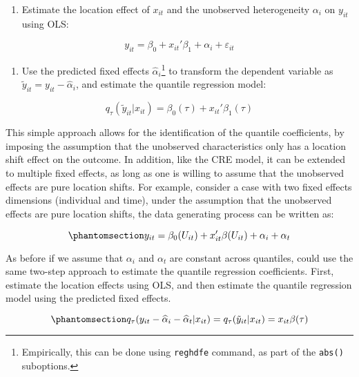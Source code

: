 \documentclass[bib]{statapress}
\providecommand{\tightlist}{%
  \setlength{\itemsep}{0pt}\setlength{\parskip}{0pt}}\usepackage{longtable,booktabs,array}
\begin{document}
\begin{enumerate}
\def\labelenumi{\arabic{enumi}.}
\tightlist
\item
  Estimate the location effect of \(x_{it}\) and the unobserved
  heterogeneity \(\alpha_i\) on \(y_{it}\) using OLS:
\end{enumerate}

\[y_{it}=\beta_0 +  x_{it}' \beta_1   +\alpha_i + \varepsilon_{it}
\]

\begin{enumerate}
\def\labelenumi{\arabic{enumi}.}
\setcounter{enumi}{1}
\tightlist
\item
  Use the predicted fixed effects \(\hat\alpha_i\)\footnote{Empirically,
    this can be done using \texttt{reghdfe} command, as part of the
    \texttt{abs()} suboptions.} to transform the dependent variable as
  \(\tilde y_{it}=y_{it}-\hat\alpha_i\), and estimate the quantile
  regression model:
\end{enumerate}

\[q_{\tau}(\tilde y_{it}|x_{it}) = \beta_0(\tau)+x_{it}'\beta_1(\tau)
\]

This simple approach allows for the identification of the quantile
coefficients, by imposing the assumption that the unobserved
characteristics only has a location shift effect on the outcome. In
addition, like the CRE model, it can be extended to multiple fixed
effects, as long as one is willing to assume that the unobserved effects
are pure location shifts. For example, consider a case with two fixed
effects dimensions (individual and time), under the assumption that the
unobserved effects are pure location shifts, the data generating process
can be written as:

\begin{equation}\phantomsection\label{eq-canay-dgp-2way}{y_{it} = \beta_0(U_{it}) + x_{it}'\beta(U_{it}) + \alpha_i + \alpha_t
}\end{equation}

As before if we assume that \(\alpha_i\) and \(\alpha_t\) are constant
across quantiles, could use the same two-step approach to estimate the
quantile regression coefficients. First, estimate the location effects
using OLS, and then estimate the quantile regression model using the
predicted fixed effects.

\begin{equation}\phantomsection\label{eq-canay-mway}{q_{\tau}(y_{it}-\hat \alpha_i - \hat \alpha_t|x_{it})=q_{\tau}(\tilde y_{it}|x_{it}) = x_{it}\beta(\tau)
}\end{equation}
\end{document}
